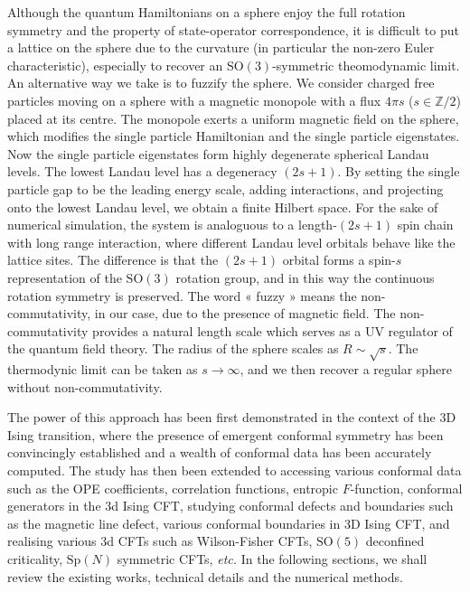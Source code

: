 \documentclass{timesjhep}
\begin{document}
Although the quantum Hamiltonians on a sphere enjoy the full rotation symmetry and the property of state-operator correspondence, it is difficult to put a lattice on the sphere due to the curvature (in particular the non-zero Euler characteristic), especially to recover an $\mathrm{SO}(3)$-symmetric theomodynamic limit. An alternative way we take is to fuzzify the sphere. We consider charged free particles moving on a sphere with a magnetic monopole with a flux $4\pi s$ ($s\in\mathbb{Z}/2$) placed at its centre. The monopole exerts a uniform magnetic field on the sphere, which modifies the single particle Hamiltonian and the single particle eigenstates. Now the single particle eigenstates form highly degenerate spherical Landau levels. The lowest Landau level has a degeneracy $(2s+1)$. By setting the single particle gap to be the leading energy scale, adding interactions, and projecting onto the lowest Landau level, we obtain a finite Hilbert space. For the sake of numerical simulation, the system is analoguous to a length-$(2s+1)$ spin chain with long range interaction, where different Landau level orbitals behave like the lattice sites. The difference is that the $(2s+1)$ orbital forms a spin-$s$ representation of the $\mathrm{SO}(3)$ rotation group, and in this way the continuous rotation symmetry is preserved. The word « fuzzy » means the non-commutativity, in our case, due to the presence of magnetic field. The non-commutativity provides a natural length scale which serves as a UV regulator of the quantum field theory. The radius of the sphere scales as $R\sim\sqrt s$. The thermodynic limit can be taken as $s\to\infty$, and we then recover a regular sphere without non-commutativity. 

The power of this approach has been first demonstrated in the context of the 3D Ising transition, where the presence of emergent conformal symmetry has been convincingly established and a wealth of conformal data has been accurately computed. The study has then been extended to accessing various conformal data such as the OPE coefficients, correlation functions, entropic $F$-function, conformal generators in the 3d Ising CFT, studying conformal defects and boundaries such as the magnetic line defect, various conformal boundaries in 3D Ising CFT, and realising various 3d CFTs such as Wilson-Fisher CFTs, $\mathrm{SO}(5)$ deconfined criticality, $\mathrm{Sp}(N)$ symmetric CFTs, \textit{etc.} In the following sections, we shall review the existing works, technical details and the numerical methods. 
\end{document}
